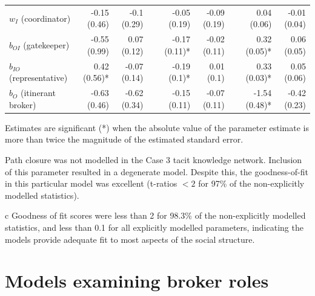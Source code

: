 \begin{table}
{\begin{threeparttable}
\begin{tabular}{@{}lrrlrrlrr@{}}
$w_I$ (coordinator) & -0.15 (0.46)\phantom{*} & -0.1 (0.29)\phantom{*} &  & -0.05 (0.19)\phantom{*} & -0.09 (0.19)\phantom{*} &  & 0.04 (0.06)\phantom{*} & -0.01 (0.04)\phantom{*} \\
$b_{OI}$ (gatekeeper) & -0.55 (0.99)\phantom{*} & 0.07 (0.12)\phantom{*} &  & -0.17 (0.11)* & -0.02 (0.11)\phantom{*} &  & 0.32 (0.05)* & 0.06 (0.05)\phantom{*} \\
$b_{IO}$ (representative) & 0.42 (0.56)* & -0.07 (0.14)\phantom{*} &  & -0.19 (0.1)* & 0.01 (0.1)\phantom{*} &  & 0.33 (0.03)* & 0.05 (0.06)\phantom{*} \\
$b_O$ (itinerant broker) & -0.63 (0.46)\phantom{*} & -0.62 (0.34)\phantom{*} &  & -0.15 (0.11)\phantom{*} & -0.07 (0.11)\phantom{*} &  & -1.54 (0.48)* & -0.42 (0.23)\phantom{*} \\
 \bottomrule
\end{tabular}
\begin{tablenotes}
\footnotesize
\item Estimates are significant (*) when the absolute value of the parameter estimate is more than twice the magnitude of the estimated standard error.
\item Path closure was not modelled in the Case 3 tacit knowledge network. Inclusion of this parameter resulted in a degenerate model. Despite this, the goodness-of-fit in this particular model was excellent (t-ratios $<2$ for 97\% of the non-explicitly modelled statistics).
\item[c] Goodness of fit scores were less than 2 for 98.3\% of the non-explicitly modelled statistics, and less than 0.1 for all explicitly modelled parameters, indicating the models provide adequate fit to most aspects of the social structure.

\end{tablenotes}

\end{threeparttable}
%
}
\end{table}

\section{Models examining broker roles}

